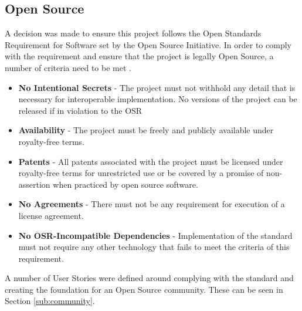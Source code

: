 \subsection{Open Source}
A decision was made to ensure this project follows the Open Standards Requirement for Software set by the Open Source Initiative. In order to comply with the requirement and ensure that the project is legally Open Source, a number of criteria need to be met \citep{initiative_2018}.
\begin{itemize}
    \item \textbf{No Intentional Secrets} - The project must not withhold any detail that is necessary for interoperable implementation. No versions of the project can be released if in violation to the OSR
    \item \textbf{Availability} - The project must be freely and publicly available under royalty-free terms.
    \item \textbf{Patents} - All patents associated with the project must be licensed under royalty-free terms for unrestricted use or be covered by a promise of non-assertion when practiced by open source software.
    \item \textbf{No Agreements} - There must not be any requirement for execution of a license agreement.
    \item \textbf{No OSR-Incompatible Dependencies} - Implementation of the standard must not require any other technology that fails to meet the criteria of this requirement.
\end{itemize}
A number of User Stories were defined around complying with the standard and creating the foundation for an Open Source community. These can be seen in Section \ref{sub:community}. 





